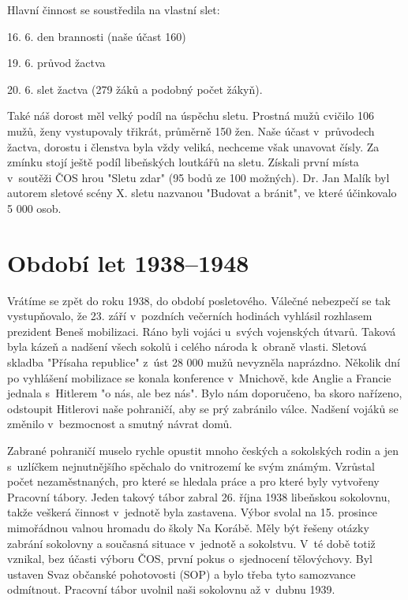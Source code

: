 \documentclass[a5paper, 11pt, twoside]{article}
\begin{document}
Hlavní činnost se soustředila na vlastní slet:
\vspace*{6pt}

16. 6. den brannosti (naše účast 160)

19. 6. průvod žactva

20. 6. slet žactva (279 žáků a podobný počet žákyň).

\vspace*{6pt}
Také náš dorost měl velký podíl na úspěchu sletu. Prostná mužů cvičilo
106 mužů, ženy vystupovaly třikrát, průměrně 150 žen. Naše účast
v~průvodech žactva, dorostu i členstva byla vždy veliká, nechceme však
unavovat čísly. Za zmínku stojí ještě podíl libeňských loutkářů na
sletu. Získali první místa v~soutěži ČOS hrou "Sletu zdar" (95 bodů ze
100 možných). Dr. Jan Malík byl autorem sletové scény X. sletu nazvanou
"Budovat a bránit", ve které účinkovalo 5 000 osob.

\section{Období let 1938--1948}

Vrátíme se zpět do roku 1938, do období posletového. Válečné nebezpečí
se tak vystupňovalo, že 23. září v~pozdních večerních hodinách vyhlásil
rozhlasem prezident Beneš mobilizaci. Ráno byli vojáci u~svých
vojenských útvarů. Taková byla kázeň a nadšení všech sokolů i celého
národa k~obraně vlasti. Sletová skladba "Přísaha republice" z~úst 28
000 mužů nevyzněla naprázdno. Několik dní po vyhlášení mobilizace se
konala konference v~Mnichově, kde Anglie a Francie jednala s~Hitlerem "o
nás, ale bez nás". Bylo nám doporučeno, ba skoro nařízeno, odstoupit
Hitlerovi naše pohraničí, aby se prý zabránilo válce. Nadšení vojáků se
změnilo v~bezmocnost a smutný návrat domů.

Zabrané pohraničí muselo rychle opustit mnoho českých a sokolských rodin
a jen s~uzlíčkem nejnutnějšího spěchalo do vnitrozemí ke svým známým.
Vzrůstal počet nezaměstnaných, pro které se hledala práce a pro které
byly vytvořeny Pracovní tábory. Jeden takový tábor zabral 26. října 1938
libeňskou sokolovnu, takže veškerá činnost v~jednotě byla zastavena.
Výbor svolal na 15. prosince mimořádnou valnou hromadu do školy Na
Korábě. Měly být řešeny otázky zabrání sokolovny a současná situace
v~jednotě a sokolstvu. V~té době totiž vznikal, bez účasti výboru ČOS,
první pokus o~sjednocení tělovýchovy. Byl ustaven Svaz občanské
pohotovosti (SOP) a bylo třeba tyto samozvance odmítnout. Pracovní tábor
uvolnil naši sokolovnu až v~dubnu 1939.
\end{document}
